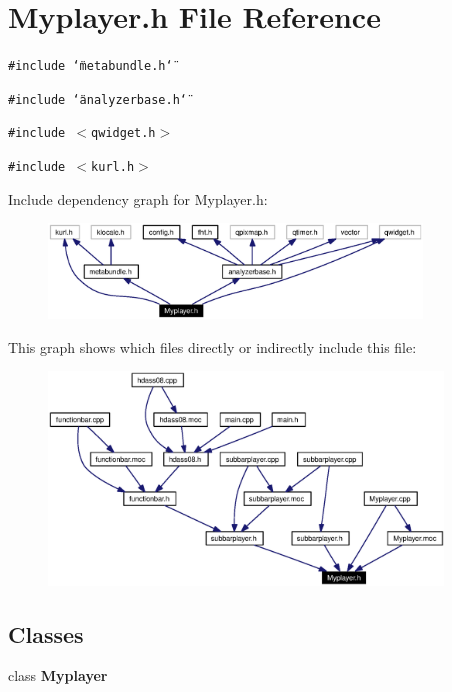 \section{Myplayer.h File Reference}
\label{Myplayer_8h}


{\tt \#include \char`\"{}metabundle.h\char`\"{}}\par
{\tt \#include \char`\"{}analyzerbase.h\char`\"{}}\par
{\tt \#include $<$qwidget.h$>$}\par
{\tt \#include $<$kurl.h$>$}\par


Include dependency graph for Myplayer.h:\begin{figure}[H]
\begin{center}
\leavevmode
\includegraphics[width=281pt]{Myplayer_8h__incl}
\end{center}
\end{figure}


This graph shows which files directly or indirectly include this file:\begin{figure}[H]
\begin{center}
\leavevmode
\includegraphics[width=297pt]{Myplayer_8h__dep__incl}
\end{center}
\end{figure}
\subsection*{Classes}
\begin{CompactItemize}
\item 
class {\bf Myplayer}
\end{CompactItemize}

